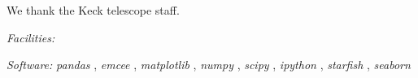 \documentclass[twocolumn]{emulateapj}%
\newcommand{\project}[1]{\textsl{#1}}
\begin{document}
\acknowledgements
We thank the Keck telescope staff. 

{\it Facilities:} 

{\it Software: } 
 \project{pandas} \citep{mckinney10},
 \project{emcee} \citep{foreman13},
 \project{matplotlib} \citep{hunter07},
 \project{numpy} \citep{vanderwalt11},
 \project{scipy} \citep{jones01},
 \project{ipython} \citep{perez07},
 \project{starfish} \citep{czekala15},
 \project{seaborn} \citep{waskom14}

\clearpage



\end{document}
